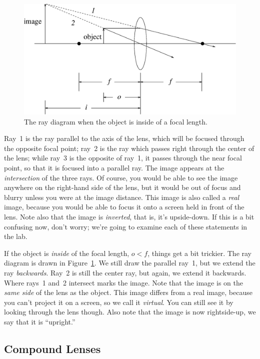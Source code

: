\begin{figure}
\centering 
\epsfxsize=13cm \includegraphics[scale=0.6]{9_imaging/insidef.eps}
\caption{The ray diagram when the object is inside of a focal length.}
\label{fig:opt:insidef}
\end{figure}

Ray~1 is the ray parallel to the axis of the lens, which will be focused 
through the opposite focal point; ray~2 is the ray which passes right through 
the center of the lens; while ray~3 is the opposite of ray~1, it passes through
the near focal point, so that it is focused into a parallel ray.  The image
appears at the {\it intersection} of the three rays.  Of course, you would be 
able to see the image anywhere on the right-hand side of the lens, but it would
be out of focus and blurry unless you were at the image distance.  This image 
is also called a {\it real} image, because you would be able to focus it onto 
a screen held in front of the lens.  Note also that the image is 
{\it inverted}, that is, it's upside-down. If this is a bit confusing now, 
don't worry; we're going to examine each of these statements in the lab.

If the object is {\it inside} of the focal length, $o<f$, things get a bit 
trickier.  The ray diagram is drawn in Figure~\ref{fig:opt:insidef}.
We still draw the parallel ray~1, but we extend the ray {\it backwards}. 
Ray~2 is still the center ray, but again, we extend it backwards.  Where rays~1
and~2 intersect marks the image. Note that the image is on the {\it same side}
of the lens as the object. This image differs from a real image, because
you can't project it on a screen, so we call it {\it virtual}.  You can still
see it by looking through the lens though. Also note that the image is now
rightside-up, we say that it is ``upright.'' 


\subsection{Compound Lenses}

